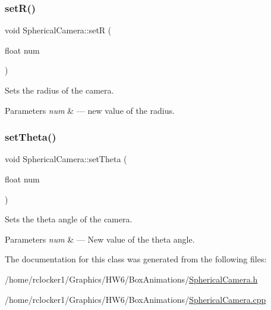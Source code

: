 \subsubsection{\texorpdfstring{set\+R()}{setR()}}
{\footnotesize\ttfamily void Spherical\+Camera\+::setR (\begin{DoxyParamCaption}\item[{float}]{num }\end{DoxyParamCaption})}



Sets the radius of the camera. 


\begin{DoxyParams}{Parameters}
{\em num} & --- new value of the radius. \\
\hline
\end{DoxyParams}
\mbox{\label{class_spherical_camera_a5ba561ae714920e6d67da11397f21a3a}} 
\subsubsection{\texorpdfstring{set\+Theta()}{setTheta()}}
{\footnotesize\ttfamily void Spherical\+Camera\+::set\+Theta (\begin{DoxyParamCaption}\item[{float}]{num }\end{DoxyParamCaption})}



Sets the theta angle of the camera. 


\begin{DoxyParams}{Parameters}
{\em num} & --- New value of the theta angle. \\
\hline
\end{DoxyParams}


The documentation for this class was generated from the following files\+:\begin{DoxyCompactItemize}
\item 
/home/rclocker1/\+Graphics/\+H\+W6/\+Box\+Animations/\hyperlink{_spherical_camera_8h}{Spherical\+Camera.\+h}\item 
/home/rclocker1/\+Graphics/\+H\+W6/\+Box\+Animations/\hyperlink{_spherical_camera_8cpp}{Spherical\+Camera.\+cpp}\end{DoxyCompactItemize}
